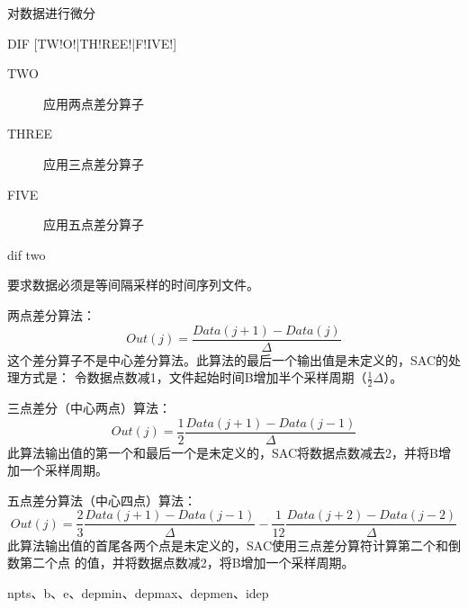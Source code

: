 \label{cmd:dif}

对数据进行微分

\begin{SACSTX}
DIF [TW!O!|TH!REE!|F!IVE!]
\end{SACSTX}

\begin{description}
\item [TWO]   应用两点差分算子
\item [THREE] 应用三点差分算子
\item [FIVE]  应用五点差分算子
\end{description}

\begin{SACDFT}
dif two
\end{SACDFT}

要求数据必须是等间隔采样的时间序列文件。

两点差分算法：
\[ Out(j) =\frac{Data(j+1) - Data(j)}{\Delta} \]
这个差分算子不是中心差分算法。此算法的最后一个输出值是未定义的，SAC的处理方式是：
令数据点数减1，文件起始时间B增加半个采样周期（$\frac{1}{2}\Delta$）。

三点差分（中心两点）算法：
\[ Out(j) = \frac{1}{2} \frac{Data(j+1) - Data(j-1)}{\Delta} \]
此算法输出值的第一个和最后一个是未定义的，SAC将数据点数减去2，并将B增加一个采样周期。

五点差分算法（中心四点）算法：
\[ Out(j) = \frac{2}{3} \frac{Data(j+1) - Data(j-1)}{\Delta} - \frac{1}{12} \frac{Data(j+2) - Data(j-2)}{\Delta} \]
此算法输出值的首尾各两个点是未定义的，SAC使用三点差分算符计算第二个和倒数第二个点
的值，并将数据点数减2，将B增加一个采样周期。

npts、b、e、depmin、depmax、depmen、idep
